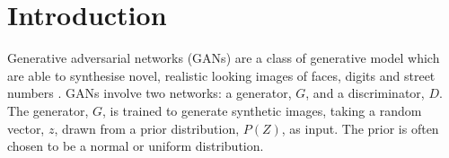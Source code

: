 \documentclass[journal]{IEEEtran}
\begin{document}
%






\section{Introduction}

Generative adversarial networks (GANs) \cite{radford2015unsupervised, goodfellow2014generative} are a class of generative model which are able to synthesise novel, realistic looking images of faces, digits and street numbers \cite{radford2015unsupervised}. GANs involve two networks: a generator, $G$, and a discriminator, $D$. The generator, $G$, is trained to generate synthetic images, taking a random vector, $z$, drawn from a prior distribution, $P(Z)$, as input. The prior is often chosen to be a normal or uniform distribution.
\end{document}
